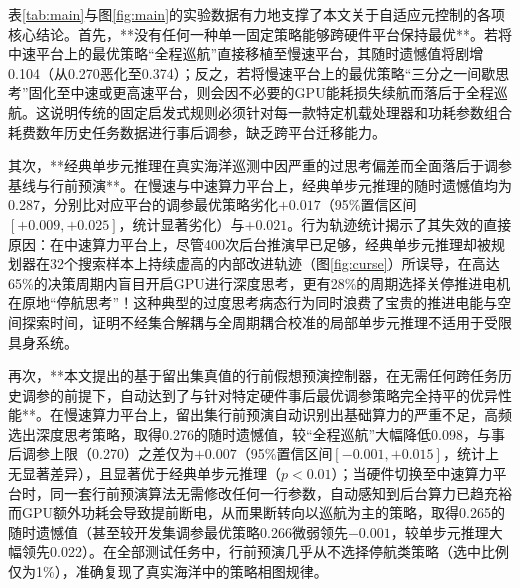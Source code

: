 表\ref{tab:main}与图\ref{fig:main}的实验数据有力地支撑了本文关于自适应元控制的各项核心结论。首先，**没有任何一种单一固定策略能够跨硬件平台保持最优**。若将中速平台上的最优策略“全程巡航”直接移植至慢速平台，其随时遗憾值将剧增0.104（从0.270恶化至0.374）；反之，若将慢速平台上的最优策略“三分之一间歇思考”固化至中速或更高速平台，则会因不必要的GPU能耗损失续航而落后于全程巡航。这说明传统的固定启发式规则必须针对每一款特定机载处理器和功耗参数组合耗费数年历史任务数据进行事后调参，缺乏跨平台迁移能力。

其次，**经典单步元推理在真实海洋巡测中因严重的过思考偏差而全面落后于调参基线与行前预演**。在慢速与中速算力平台上，经典单步元推理的随时遗憾值均为0.287，分别比对应平台的调参最优策略劣化$+0.017$（95\%置信区间$[+0.009, +0.025]$，统计显著劣化）与$+0.021$。行为轨迹统计揭示了其失效的直接原因：在中速算力平台上，尽管400次后台推演早已足够，经典单步元推理却被规划器在32个搜索样本上持续虚高的内部改进轨迹（图\ref{fig:curse}）所误导，在高达65\%的决策周期内盲目开启GPU进行深度思考，更有28\%的周期选择关停推进电机在原地“停航思考”！这种典型的过度思考病态行为同时浪费了宝贵的推进电能与空间探索时间，证明不经集合解耦与全周期耦合校准的局部单步元推理不适用于受限具身系统。

再次，**本文提出的基于留出集真值的行前假想预演控制器，在无需任何跨任务历史调参的前提下，自动达到了与针对特定硬件事后最优调参策略完全持平的优异性能**。在慢速算力平台上，留出集行前预演自动识别出基础算力的严重不足，高频选出深度思考策略，取得0.276的随时遗憾值，较“全程巡航”大幅降低0.098，与事后调参上限（0.270）之差仅为$+0.007$（95\%置信区间$[-0.001, +0.015]$，统计上无显著差异），且显著优于经典单步元推理（$p < 0.01$）；当硬件切换至中速算力平台时，同一套行前预演算法无需修改任何一行参数，自动感知到后台算力已趋充裕而GPU额外功耗会导致提前断电，从而果断转向以巡航为主的策略，取得0.265的随时遗憾值（甚至较开发集调参最优策略0.266微弱领先$-0.001$，较单步元推理大幅领先0.022）。在全部测试任务中，行前预演几乎从不选择停航类策略（选中比例仅为1\%），准确复现了真实海洋中的策略相图规律。

